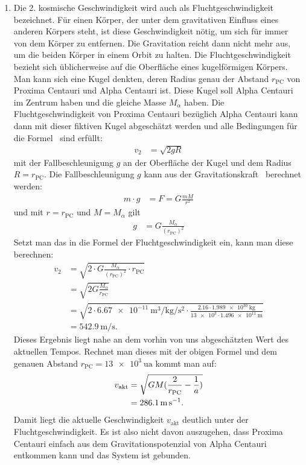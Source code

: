 \begin{enumerate}
	\item Die 2. kosmische Geschwindigkeit wird auch als Fluchtgeschwindigkeit bezeichnet. Für einen Körper, der unter dem gravitativen Einfluss eines anderen Körpers steht, ist diese Geschwindigkeit nötig, um sich für immer von dem Körper zu entfernen. Die Gravitation reicht dann nicht mehr aus, um die beiden Körper in einem Orbit zu halten. Die Fluchtgeschwindigkeit bezieht sich üblicherweise auf die Oberfläche eines kugelförmigen Körpers. Man kann sich eine Kugel denkten, deren Radius genau der Abstand $r_{\text{PC}}$ von Proxima Centauri und Alpha Centauri ist. Diese Kugel soll Alpha Centauri im Zentrum haben und die gleiche Masse $M_\alpha$ haben. Die Fluchtgeschwindigkeit von Proxima Centauri bezüglich Alpha Centauri kann dann mit dieser fiktiven Kugel abgeschätzt werden und alle Bedingungen für die Formel~\cite[S.15]{Cornelsen2013} sind erfüllt:
	\begin{align*}
		v_2&=\sqrt{2gR}
	\end{align*}
	mit der Fallbeschleunigung $g$ an der Oberfläche der Kugel und dem Radius $R=r_{\text{PC}}$. Die Fallbeschleunigung $g$ kann aus der Gravitationskraft~\cite[S.15]{Cornelsen2013} berechnet werden:
	\begin{align*}
		m\cdot g&=F=G\frac{mM}{r^2}
	\end{align*}
	und mit $r=r_{\text{PC}}$ und $M=M_\alpha$ gilt
	\begin{align*}
		g&=G\frac{M_\alpha}{(r_{\text{PC}})^2}
	\end{align*}
	Setzt man das in die Formel der Fluchtgeschwindigkeit ein, kann man diese berechnen:
	\begin{align*}
		v_2&=\sqrt{2\cdot G\frac{M_\alpha}{(r_{\text{PC}})^2}\cdot r_{\text{PC}}}\\
		&=\sqrt{2G\frac{M_\alpha}{r_{\text{PC}}}}\\
		&=\sqrt{2\cdot \SI{6.67e-11}{\meter\cubed\per\kg\per\second\squared}\cdot \frac{\num{2.16}\cdot\SI{1.989e30}{\kg}}{\num{13e3}\cdot\SI{1.496e11}{\meter}}}\\
		&=\SI{542.9}{\meter\per\second}.
	\end{align*}
	Dieses Ergebnis liegt nahe an dem vorhin von uns abgeschätzten Wert des aktuellen Tempos. Rechnet man dieses mit der obigen Formel und dem genauen Abstand $r_{\text{PC}}=\SI{13e3}{\astronomicalunit}$ kommt man auf:
	\begin{align*}
		v_{\text{akt}}&=\sqrt{GM\relax(\frac{2}{r_{\text{PC}}}-\frac{1}{a})}\\
		&=\SI{286.1}{\meter\per\second}.
	\end{align*}
	Damit liegt die aktuelle Geschwindigkeit $v_{\text{akt}}$ deutlich unter der Fluchtgeschwindigkeit. Es ist also nicht davon auszugehen, dass Proxima Centauri einfach aus dem Gravitationspotenzial von Alpha Centauri entkommen kann und das System ist gebunden.

\end{enumerate}





